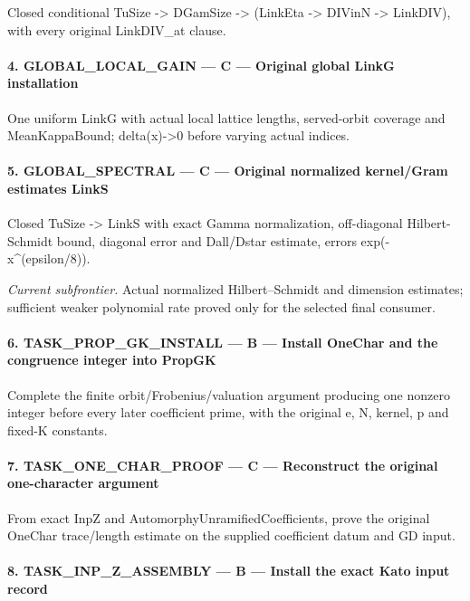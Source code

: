 \documentclass[11pt,a4paper]{article}
\numberwithin{equation}{section}
\theoremstyle{remark}\newtheorem{remark}[theorem]{Remark}
\begin{document}
Closed conditional TuSize -> DGamSize -> (LinkEta -> DIVinN -> LinkDIV), with every original LinkDIV\_\allowbreak{}at clause.


\paragraph{4. GLOBAL\_\allowbreak{}LOCAL\_\allowbreak{}GAIN — C — Original global LinkG installation}

One uniform LinkG with actual local lattice lengths, served-orbit coverage and MeanKappaBound; delta(x)->0 before varying actual indices.


\paragraph{5. GLOBAL\_\allowbreak{}SPECTRAL — C — Original normalized kernel/\allowbreak{}Gram estimates LinkS}

Closed TuSize -> LinkS with exact Gamma normalization, off-diagonal Hilbert-Schmidt bound, diagonal error and Dall/\allowbreak{}Dstar estimate, errors exp(-x\textasciicircum{}(epsilon/\allowbreak{}8)).


\emph{Current subfrontier.} Actual normalized Hilbert–Schmidt and dimension estimates; sufficient weaker polynomial rate proved only for the selected final consumer.


\paragraph{6. TASK\_\allowbreak{}PROP\_\allowbreak{}GK\_\allowbreak{}INSTALL — B — Install OneChar and the congruence integer into PropGK}

Complete the finite orbit/\allowbreak{}Frobenius/\allowbreak{}valuation argument producing one nonzero integer before every later coefficient prime, with the original e,\allowbreak{} N,\allowbreak{} kernel,\allowbreak{} p and fixed-K constants.


\paragraph{7. TASK\_\allowbreak{}ONE\_\allowbreak{}CHAR\_\allowbreak{}PROOF — C — Reconstruct the original one-character argument}

From exact InpZ and AutomorphyUnramifiedCoefficients, prove the original OneChar trace/\allowbreak{}length estimate on the supplied coefficient datum and GD input.


\paragraph{8. TASK\_\allowbreak{}INP\_\allowbreak{}Z\_\allowbreak{}ASSEMBLY — B — Install the exact Kato input record}
\end{document}
